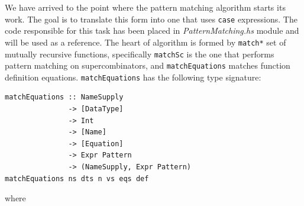 \documentclass[12pt,a4paper]{report}
\begin{document}
We have arrived to the point where the pattern matching algorithm starts its
work. The goal is to translate this form into one that uses \texttt{case}
expressions. The code responsible for this task has been placed in
\textit{PatternMatching.hs} module and will be used as a reference. The heart
of algorithm is formed by \texttt{match*} set of mutually recursive functions,
specifically \texttt{matchSc} is the one that performs pattern matching on
supercombinators, and \texttt{matchEquations} matches function definition
equations. \texttt{matchEquations} has the following type signature:

\vspace*{0.2in}
\begin{lstlisting}[style=haskell]
matchEquations :: NameSupply
               -> [DataType]
               -> Int
               -> [Name]
               -> [Equation]
               -> Expr Pattern
               -> (NameSupply, Expr Pattern)
matchEquations ns dts n vs eqs def
\end{lstlisting}
where
\end{document}
